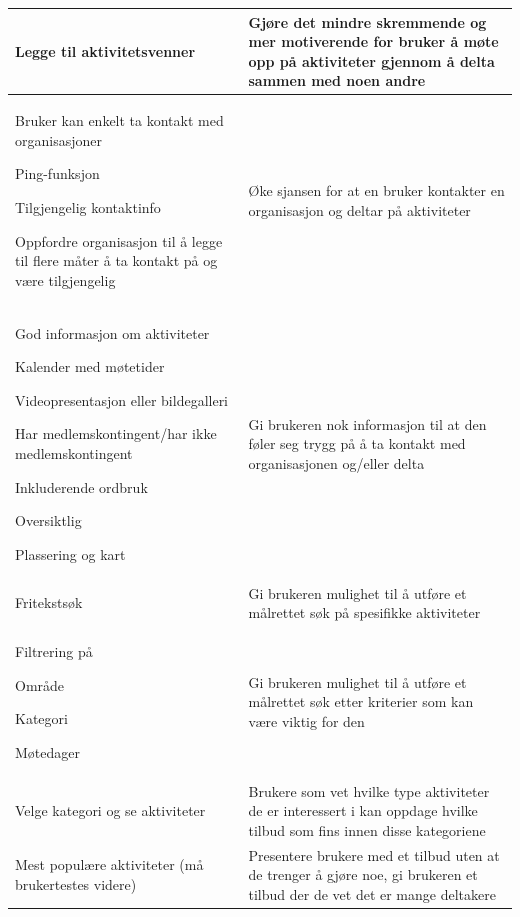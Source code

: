 \begin{center}
\begin{longtabu}{|X|X|}
Legge til aktivitetsvenner & 
Gjøre det mindre skremmende og mer motiverende for bruker å møte opp på aktiviteter gjennom å delta sammen med noen andre \\ \hline

Bruker kan enkelt ta kontakt med organisasjoner
\begin{compactitem}
    \item Ping-funksjon
    \item Tilgjengelig kontaktinfo
    \item Oppfordre organisasjon til å legge til flere måter å ta kontakt på og være tilgjengelig
\end{compactitem}
& Øke sjansen for at en bruker kontakter en organisasjon og deltar på aktiviteter \\ \hline

God informasjon om aktiviteter 
\begin{compactitem}
    \item Kalender med møtetider
    \item Videopresentasjon eller bildegalleri
    \item Har medlemskontingent/har ikke medlemskontingent
    \item Inkluderende ordbruk
    \item Oversiktlig
    \item Plassering og kart
\end{compactitem}
&  Gi brukeren nok informasjon til at den føler seg trygg på å ta kontakt med organisasjonen og/eller delta\\ \hline

Fritekstsøk
& Gi brukeren mulighet til å utføre et målrettet søk på spesifikke aktiviteter \\ \hline

Filtrering på
\begin{compactitem}
    \item Område
    \item Kategori
    \item Møtedager
\end{compactitem}
& Gi brukeren mulighet til å utføre et målrettet søk etter kriterier som kan være viktig for den \\ \hline

Velge kategori og se aktiviteter
& Brukere som vet hvilke type aktiviteter de er interessert i kan oppdage hvilke tilbud som fins innen disse kategoriene \\ \hline

Mest populære aktiviteter (må brukertestes videre) 
& Presentere brukere med et tilbud uten at de trenger å gjøre noe, gi brukeren et tilbud der de vet det er mange deltakere \\ \hline

\end{longtabu}
\end{center}

